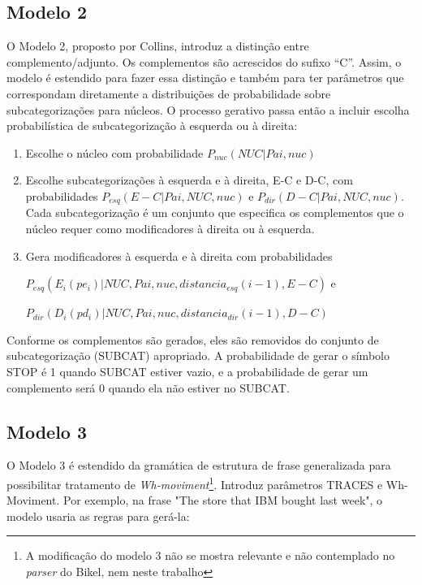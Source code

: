 \subsection{Modelo 2}
\label{sub:modelo2}

O Modelo 2, proposto por Collins, introduz a distinção entre complemento/adjunto. Os complementos  são acrescidos do sufixo ``C''. Assim, o modelo é estendido para fazer essa distinção e também para ter parâmetros que correspondam diretamente a distribuições de probabilidade sobre subcategorizações para núcleos.
O processo gerativo passa então a incluir escolha probabilística de subcategorização à esquerda ou à direita:

\begin{enumerate}
  \item Escolhe o núcleo com probabilidade $P_{nuc}(NUC|Pai, nuc)$
  \item Escolhe subcategorizações à esquerda e à direita, E-C e D-C, com probabilidades $P_{esq}(E-C|Pai,NUC, nuc)$ e $P_{dir}(D-C|Pai,NUC, nuc)$. Cada subcategorização é um conjunto que especifica os complementos que o núcleo requer como modificadores à direita ou à esquerda.
  \item Gera modificadores à esquerda e à direita com probabilidades

$P_{esq}(E_i(pe_i)|NUC, Pai, nuc, distancia_{esq}(i - 1),E - C)$ e

$P_{dir}(D_i(pd_i)|NUC, Pai, nuc, distancia_{dir}(i - 1),D - C)$

\end{enumerate}


Conforme os complementos são gerados, eles são removidos do conjunto de subcategorização (SUBCAT) apropriado. A probabilidade de gerar o símbolo STOP é 1 quando SUBCAT estiver vazio, e a probabilidade de gerar um complemento será 0 quando ela não estiver no SUBCAT.



\subsection{Modelo 3}
\label{sub:modelo3}


O Modelo 3 é estendido da gramática de estrutura de frase generalizada para possibilitar tratamento de \emph{Wh-moviment}\footnote{A modificação do modelo 3 não se mostra relevante e não contemplado no \emph{parser} do Bikel, nem neste trabalho}. Introduz parâmetros TRACES e Wh-Moviment. Por exemplo, na frase "The store that IBM bought last week", o modelo usaria as regras para gerá-la:

